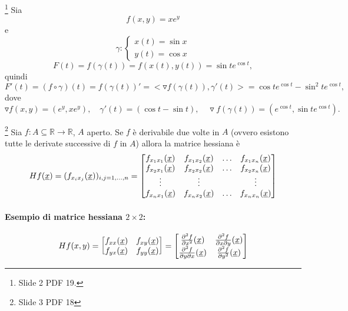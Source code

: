 \begin{example}
	\footnote{Slide 2 PDF 19.}
	Sia
	\begin{equation*}
		f(x,y) = x e^y
	\end{equation*}
	e
	\begin{equation*}
		\gamma:
		\begin{cases}
			x(t)=\sin x\\
			y(t)=\cos x
		\end{cases}
	\end{equation*}
	\begin{equation*}
		F(t)=f(\gamma(t)) = f(x(t), y(t)) = \sin t e^{\cos t},
	\end{equation*}
	quindi
	\begin{equation*}
		F'(t) = (f\circ\gamma)(t) = f(\gamma(t))' = <\triangledown f(\gamma(t)), \gamma'(t)>=\cos te^{\cos t}-\sin^2te^{\cos t},
	\end{equation*}
	dove
	\begin{equation*}
		\triangledown f(x,y) = (e^y, xe^y), \quad \gamma'(t)=(\cos t-\sin t),\quad \triangledown f(\gamma(t)) = \left(e^{\cos t}, \sin t e^{\cos t}\right).
	\end{equation*}
\end{example}

\begin{definition}\footnote{Slide 3 PDF 18}
	Sia $f:A\subseteq\mathbb{R}\rightarrow \mathbb{R}$, $A$ aperto. Se $f$ è derivabile due volte in $A$ (ovvero esistono tutte le derivate successive di $f$ in $A$) allora la matrice hessiana è
	\begin{equation*}
		Hf(\uline x) = (f_{x_ix_j}(\uline x))_{i,j=1,\hdots, n} =
		\begin{bmatrix}
			f_{x_1x_1}(\uline x) & f_{x_1x_2}(\uline x) & \hdots & f_{x_1x_n}(\uline x)\\
			f_{x_2x_1}(\uline x) & f_{x_2x_2}(\uline x) & \hdots & f_{x_2x_n}(\uline x)\\
			\vdots & \vdots & & \vdots\\
				f_{x_nx_1}(\uline x) & f_{x_nx_2}(\uline x) & \hdots & f_{x_nx_n}(\uline x)\\
		\end{bmatrix}
	\end{equation*}
\end{definition}

\paragraph{Esempio di matrice hessiana $2\times 2$:}
\begin{equation*}
		Hf(x,y) =
		\begin{bmatrix}
			f_{xx}(\uline x) & f_{xy}(\uline x)\\
			f_{yx}(\uline x) &  f_{yy}(\uline x)
		\end{bmatrix} =
		\begin{bmatrix}
				\frac{\partial^2 f}{\partial x^2} (\uline x)& 	\frac{\partial ^2 f}{\partial x\partial y}(\uline x)\\
				\frac{\partial ^2 f}{\partial y\partial x}(\uline x) & \frac{\partial^2 f}{\partial y^2}(\uline x)
		\end{bmatrix}
\end{equation*}

